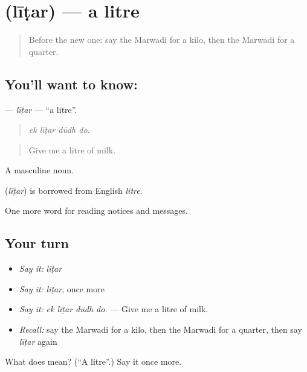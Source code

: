 \section[\texorpdfstring{\mw{लीटर} (līṭar)}{लीटर (līṭar)}]{ (līṭar) — a litre}

\label{lesson:MW-C200-litar}



\begin{quote}
Before the new one: say the Marwadi for a kilo, then the Marwadi for a quarter.
\end{quote}

\subsection*{You'll want to know: }
\textbf{} — \emph{līṭar} — \textquotedblleft{}a litre\textquotedblright{}.

\begin{quote}
   
\end{quote}

\begin{quote}
\emph{ek līṭar dūdh do.}
\end{quote}

\begin{quote}
Give me a litre of milk.
\end{quote}

A masculine noun.

\begin{cousinweb}
\textbf{} (\emph{līṭar}) is borrowed from English \emph{litre}.
\end{cousinweb}

\begin{grammarlens}[title={What you've built}]
One more word for reading notices and messages.
\end{grammarlens}

\subsection*{Your turn}
\begin{itemize}
\raggedright
  \item \emph{Say it:} \emph{līṭar}
  \item \emph{Say it:} \emph{līṭar}, once more
  \item \emph{Say it:} \emph{ek līṭar dūdh do.} — Give me a litre of milk.
  \item \emph{Recall:} say the Marwadi for a kilo, then the Marwadi for a quarter, then say \emph{līṭar} again
\end{itemize}

\begin{tcolorbox}[breakable,colback=teal!4,colframe=teal!35!black,title={Before you move on}]
What does  mean? (\textquotedblleft{}A litre\textquotedblright{}.) Say it once more.
\end{tcolorbox}
